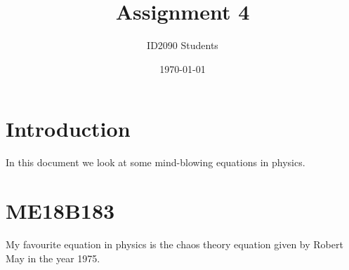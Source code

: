\documentclass[a4paper, 12pt]{article}
\begin{document}
\title{Assignment 4}
\author{ID2090 Students}
\date{\today}
\maketitle

\tableofcontents

\section{Introduction}
In this document we look at some mind-blowing equations in physics.

\section{ME18B183}
My favourite equation in physics is the chaos theory equation given by Robert May in the year 1975.\\
\newline

\end{document}
